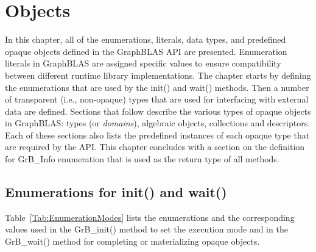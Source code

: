 \chapter{Objects}
\label{Chp:Objects}

In this chapter, all of the enumerations, literals, data types, and predefined 
opaque objects defined in the GraphBLAS API are presented.  Enumeration literals 
in GraphBLAS are assigned specific values to ensure compatibility between 
different runtime library implementations.  The chapter starts by defining the
enumerations that are used by the {\sf init()} and {\sf wait()} methods.  Then
a number of transparent (i.e., non-opaque) types that are used for interfacing 
with external data are defined.  Sections that follow describe the various
types of opaque objects in GraphBLAS: types (or \emph{domains}), algebraic 
objects, collections and descriptors.  Each of these sections also lists the 
predefined instances of each opaque type that are required by the API.  This chapter
concludes with a section on the definition for {\sf GrB\_Info} enumeration 
that is used as the return type of all methods.

\section{Enumerations for {\sf init()} and {\sf wait()}}

Table~\ref{Tab:EnumerationModes} lists the enumerations and the corresponding
values used in the {\sf GrB\_init()} method to set the execution mode and in
the {\sf GrB\_wait()} method for completing or materializing opaque objects.

